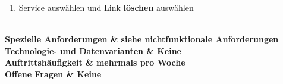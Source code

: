 \documentclass[11pt]{scrartcl}
\begin{document}
\begin{longtabu}
\begin{enumerate}
\begin{enumerate}
\begin{enumerate}
              \item Service auswählen und Link \textbf{löschen} auswählen
            \end{enumerate}
        \end{enumerate}
      \end{enumerate}
      \\\hline
	\bfseries Spezielle Anforderungen & siehe nichtfunktionale Anforderungen  \\\hline 
	\bfseries Technologie- und Datenvarianten & Keine  \\\hline 
	\bfseries Auftrittshäufigkeit & mehrmals pro Woche  \\\hline 
	\bfseries Offene Fragen & Keine  \\\hline  
\end{longtabu}
\newpage
\end{document}
